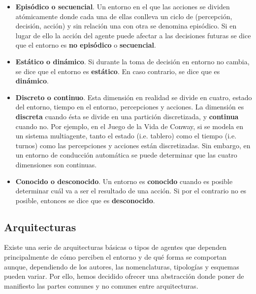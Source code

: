 \begin{itemize}
\begin{marginfigure}
\end{marginfigure}
	\item \textbf{Episódico o secuencial}. Un entorno en el que las acciones se dividen atómicamente donde cada una de ellas conlleva un ciclo de (percepción, decisión, acción) y sin relación una con otra se denomina episódico. Si en lugar de ello la acción del agente puede afectar a las decisiones futuras se dice que el entorno es \textbf{no episódico} o \textbf{secuencial}.
	\item \textbf{Estático o dinámico}. Si durante la toma de decisión en entorno no cambia, se dice que el entorno es \textbf{estático}. En caso contrario, se dice que es \textbf{dinámico}.
	\item \textbf{Discreto o continuo}. Esta dimensión en realidad se divide en cuatro, estado del entorno, tiempo en el entorno, percepciones y acciones. La dimensión es \textbf{discreta} cuando ésta se divide en una partición discretizada, y \textbf{continua} cuando no. Por ejemplo, en el Juego de la Vida de Conway, si se modela en un sistema multiagente, tanto el estado (i.e. tablero) como el tiempo (i.e. turnos) como las percepciones y acciones están discretizadas. Sin embargo, en un entorno de conducción automática se puede determinar que las cuatro dimensiones son continuas.
	\item \textbf{Conocido o desconocido}. Un entorno es \textbf{conocido} cuando es posible determinar cuál va a ser el resultado de una acción. Si por el contrario no es posible, entonces se dice que es \textbf{desconocido}.
\end{itemize}

\subsection{Arquitecturas}

Existe una serie de arquitecturas básicas o tipos de agentes que dependen principalmente de cómo perciben el entorno y de qué forma se comportan aunque, dependiendo de los autores, las nomenclaturas, tipologías y esquemas pueden variar. Por ello, hemos decidido ofrecer una abstracción donde poner de manifiesto las partes comunes y no comunes entre arquitecturas.

